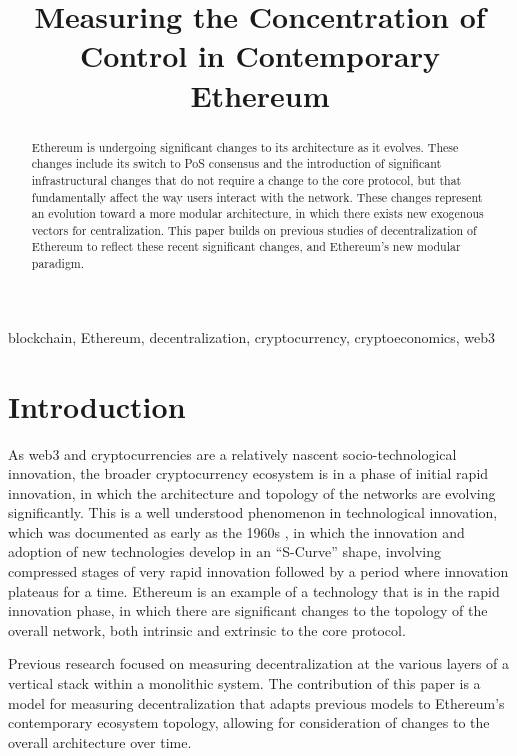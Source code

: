 \documentclass[conference]{IEEEtran}
\begin{document}
\title{Measuring the Concentration of Control in Contemporary Ethereum}

\author{
}

\maketitle

\begin{abstract}
Ethereum is undergoing significant changes to its architecture as it evolves.  These changes include its switch to PoS consensus and the introduction of significant infrastructural changes that do not require a change to the core protocol, but that fundamentally affect the way users interact with the network.  These changes represent an evolution toward a more modular architecture, in which there exists new exogenous vectors for centralization.  This paper builds on previous studies of decentralization of Ethereum to reflect these recent significant changes, and Ethereum's new modular paradigm.
\end{abstract}

\begin{IEEEkeywords}
blockchain, Ethereum, decentralization, cryptocurrency, cryptoeconomics, web3
\end{IEEEkeywords}

\section{Introduction}

As web3 and cryptocurrencies are a relatively nascent socio-technological innovation, the broader cryptocurrency ecosystem is in a phase of initial rapid innovation, in which the architecture and topology of the networks are evolving significantly.  This is a well understood phenomenon in technological innovation, which was documented as early as the 1960s \cite{rogers2010diffusion}, in which the innovation and adoption of new technologies develop in an “S-Curve” shape, involving compressed stages of very rapid innovation followed by a period where innovation plateaus for a time.  Ethereum is an example of a technology that is in the rapid innovation phase, in which there are significant changes to the topology of the overall network, both intrinsic and extrinsic to the core protocol.

Previous research \cite{gochhayat2020measuring, lin2021measuring, karakostas2022sok} focused on measuring decentralization at the various layers of a vertical stack within a monolithic system.  The contribution of this paper is a model for measuring decentralization that adapts previous models to Ethereum's contemporary ecosystem topology, allowing for consideration of changes to the overall architecture over time.
\end{document}
